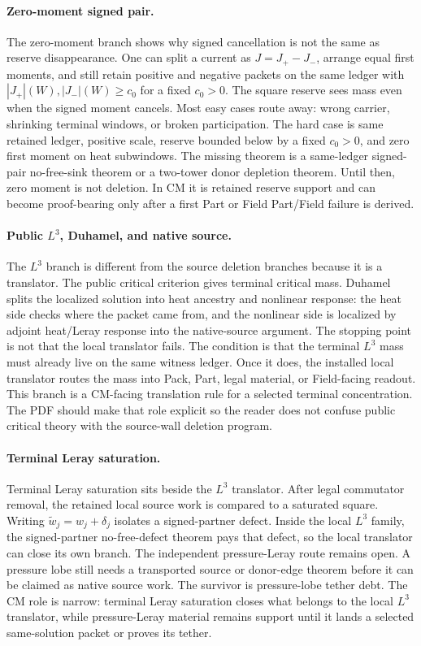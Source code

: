 \paragraph{Zero-moment signed pair.}
The zero-moment branch shows why signed cancellation is not the same as
reserve disappearance.
One can split a current as \(J=J_+-J_-\), arrange equal first moments, and
still retain positive and negative packets on the same ledger with
\(|J_+|(W),|J_-|(W)\ge c_0\) for a fixed \(c_0>0\).
The square reserve sees mass even when the signed moment cancels.
Most easy cases route away: wrong carrier, shrinking terminal windows, or
broken participation.
The hard case is same retained ledger, positive scale, reserve bounded below by
a fixed \(c_0>0\), and
zero first moment on heat subwindows.
The missing theorem is a same-ledger signed-pair no-free-sink theorem or a
two-tower donor depletion theorem.
Until then, zero moment is not deletion.
In CM it is retained reserve support and can become proof-bearing only after a
first Part or Field Part/Field failure is derived.

\paragraph{Public \(L^3\), Duhamel, and native source.}
The \(L^3\) branch is different from the source deletion branches because it
is a translator.
The public critical criterion gives terminal critical mass.
Duhamel splits the localized solution into heat ancestry and nonlinear
response:
the heat side checks where the packet came from, and the nonlinear side is
localized by adjoint heat/Leray response into the native-source argument.
The stopping point is not that the local translator fails.
The condition is that the terminal \(L^3\) mass must already live on the same
witness ledger.
Once it does, the installed local translator routes the mass into Pack, Part,
legal material, or Field-facing readout.
This branch is a CM-facing translation rule for a selected terminal concentration.
The PDF should make that role explicit so the reader does not confuse public
critical theory with the source-wall deletion program.

\paragraph{Terminal Leray saturation.}
Terminal Leray saturation sits beside the \(L^3\) translator.
After legal commutator removal, the retained local source work is compared to a
saturated square.
Writing \(\widetilde w_j=w_j+\delta_j\) isolates a signed-partner defect.
Inside the local \(L^3\) family, the signed-partner no-free-defect theorem pays
that defect, so the local translator can close its own branch.
The independent pressure-Leray route remains open.
A pressure lobe still needs a transported source or donor-edge theorem before
it can be claimed as native source work.
The survivor is pressure-lobe tether debt.
The CM role is narrow: terminal Leray saturation closes what belongs to the
local \(L^3\) translator, while pressure-Leray material remains support until
it lands a selected same-solution packet or proves its tether.

